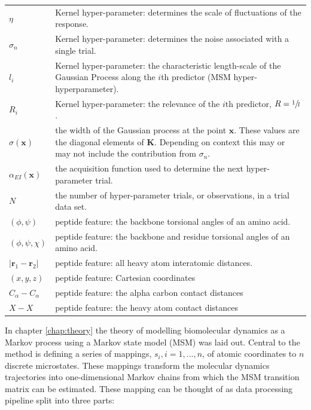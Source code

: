 \begin{table}
\begin{tabularx}{0.9\textwidth}{ |l| >{\raggedright\arraybackslash}X | }
        $\eta$ & Kernel hyper-parameter: determines the scale of fluctuations of the response. \\
        $\sigma_{n}$ & Kernel hyper-parameter: determines the noise associated with a single trial. \\
        $l_{i}$ & Kernel hyper-parameter: the characteristic length-scale of the Gaussian Process 
                along the $i$th predictor (MSM hyper-hyperparameter).\\
        $R_{i}$ & Kernel hyper-parameter: the relevance of the $i$th predictor, $R=\sfrac{1}{l}$. \\ 
        $\sigma(\mathbf{x})$ & the width of the Gaussian process at the point $\mathbf{x}$. These values  are the diagonal elements of $\mathbf{K}$. Depending on context this may or may not include the contribution from $\sigma_{n}$. \\
        $\alpha_{EI}(\mathbf{x})$ & the acquisition function used to determine the next hyper-parameter trial. \\
        $N$ & the number of hyper-parameter trials, or observations,  in a trial data set.\\
        $(\phi, \psi)$ & peptide feature: the backbone torsional angles of an amino acid.  \\
        $(\phi, \psi, \chi)$ & peptide feature: the backbone and residue torsional angles of an amino acid. \\
        $|\mathbf{r}_{1}-\mathbf{r}_{2}|$ & peptide feature: all heavy atom interatomic distances.  \\
        $(x, y, z)$ & peptide feature: Cartesian coordinates \\
        $C_{\alpha}-C_{\alpha}$ & peptide feature: the alpha carbon contact distances \\
        $X-X$ & peptide feature: the heavy atom contact distances \\
    \hline
     \end{tabularx}
    \label{tab:my_label}
\end{table}

In chapter \ref{chap:theory} the theory of modelling biomolecular dynamics as a Markov process using a Markov state model (MSM) was laid out. Central to the method is defining  a series of mappings, $s_i, i=1, ..., n$, of atomic coordinates to $n$ discrete microstates. These mappings transform the molecular dynamics trajectories into one-dimensional Markov chains from which the MSM transition matrix can be estimated. These mapping can be thought of as data processing pipeline split into three parts: 

